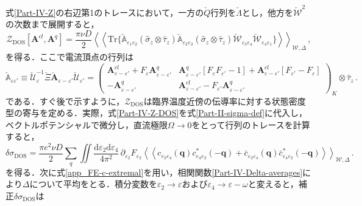 \documentclass[a4paper,11pt]{ltjsarticle}
\def\Tr{\mathrm{Tr}}
\def\d{\mathrm{d}}
\begin{document}
式\eqref{Part-IV-Z}の右辺第1のトレースにおいて，一方の$\check{Q}$行列を$\check{\Lambda}$とし，他方を$\check{\mathcal{W}}^{2}$の次数まで展開すると，
\begin{equation}\label{Part-IV-Z-DOS}
\mathcal{Z}_{\mathrm{DOS}}[\mathbf{A}^{cl},\mathbf{A}^{q}]=\frac{\pi\nu
D}{2}\left\langle\left\langle\Tr\{\check{\mathbb{A}}_{\varepsilon_{1}\varepsilon_{2}}
(\hat{\sigma}_{z}\otimes\hat{\tau}_{z})
\check{\mathbb{A}}_{\varepsilon_{2}\varepsilon_{3}}
(\hat{\sigma}_{z}\otimes\hat{\tau}_{z})
\check{\mathcal{W}}_{\varepsilon_{3}\varepsilon_{4}}
\check{\mathcal{W}}_{\varepsilon_{4}\varepsilon_{1}}\}
\right\rangle\right\rangle_{\mathcal{W},\Delta}\,,
\end{equation}
を得る．ここで電流頂点の行列は
\begin{equation}
\check{\mathbb{A}}_{\varepsilon\varepsilon'}\equiv
\check{\mathcal{U}}_{\varepsilon}^{-1}
\check{\Xi}\check{\mathbf{A}}_{\varepsilon-\varepsilon'}\check{\mathcal{U}}_{\varepsilon'}
=\left(\begin{array}{cc}
\mathbf{A}^{cl}_{\varepsilon-\varepsilon'}+F_{\varepsilon}
\mathbf{A}^{q}_{\varepsilon-\varepsilon'} &
\mathbf{A}^{q}_{\varepsilon-\varepsilon'}[F_{\varepsilon}F_{\varepsilon'}
- 1]
+\mathbf{A}^{cl}_{\varepsilon-\varepsilon'}[F_{\varepsilon'}-F_{\varepsilon}]\\
-\mathbf{A}^{q}_{\varepsilon-\varepsilon'} &
\mathbf{A}^{cl}_{\varepsilon-\varepsilon'} -
F_{\varepsilon'}\mathbf{A}^{q}_{\varepsilon-\varepsilon'}
\end{array}\right)_K\otimes\hat \tau_{z}\,.
\end{equation}
である．すぐ後で示すように，$\mathcal{Z}_{\mathrm{DOS}}$は臨界温度近傍の伝導率に対する状態密度型の寄与を定める．実際，式\eqref{Part-IV-Z-DOS}を式\eqref{Part-II-sigma-def}に代入し，ベクトルポテンシャルで微分し，直流極限$\Omega\to0$をとって行列のトレースを計算すると，
\begin{equation}\label{Part-IV-sigma-DOS-cc}
\delta\sigma_{\mathrm{DOS}}=\frac{\pi e^2\nu D}{2}
\sum_{q}\iint\frac{\d\varepsilon_{2}\d\varepsilon_{4}}{4\pi^2}\,
\partial_{\varepsilon_{2}}F_{\varepsilon_{2}}
\left\langle\left\langle
c_{\varepsilon_{2}\varepsilon_{4}}(\mathbf{q})
c^{*}_{\varepsilon_{4}\varepsilon_{2}}(-\mathbf{q})+
\bar{c}_{\varepsilon_{2}\varepsilon_{4}}(\mathbf{q})
\bar{c}^{*}_{\varepsilon_{4}\varepsilon_{2}}(-\mathbf{q})
\right\rangle\right\rangle_{\mathcal{W},\Delta} \,.
\end{equation}
を得る．次に式\eqref{app_FE-c-extremal}を用い，相関関数\eqref{Part-IV-Delta-averages}により$\Delta$について平均をとる．積分変数を$\varepsilon_{2}\to\varepsilon$および$\varepsilon_{4}\to\varepsilon-\omega$と変えると，補正$\delta\sigma_{\mathrm{DOS}}$は
\end{document}

